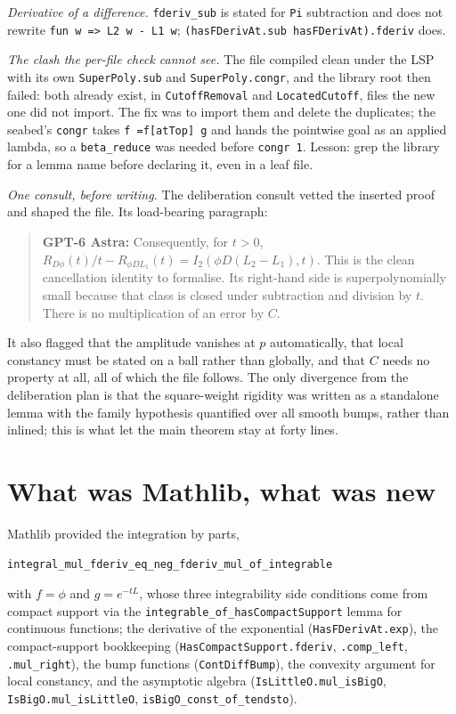 \documentclass[11pt]{article}
\newcommand{\code}[1]{\texttt{#1}}
\newcommand{\gptbox}[1]{\par\medskip\begin{quote}\small\textbf{\textcolor{green!50!black}{GPT-6 Astra:}} #1\end{quote}\medskip}
\begin{document}
\emph{Derivative of a difference.} \code{fderiv\_sub} is stated for
\code{Pi} subtraction and does not rewrite \code{fun w => L2 w - L1 w};
\code{(hasFDerivAt.sub hasFDerivAt).fderiv} does.

\emph{The clash the per-file check cannot see.} The file compiled clean
under the LSP with its own \code{SuperPoly.sub} and \code{SuperPoly.congr},
and the library root then failed: both already exist, in
\code{CutoffRemoval} and \code{LocatedCutoff}, files the new one did not
import. The fix was to import them and delete the duplicates; the
seabed's \code{congr} takes \code{f =f[atTop] g} and hands the pointwise
goal as an applied lambda, so a \code{beta\_reduce} was needed before
\code{congr 1}. Lesson: grep the library for a lemma name before
declaring it, even in a leaf file.

\emph{One consult, before writing.} The deliberation consult vetted the
inserted proof and shaped the file. Its load-bearing paragraph:
\gptbox{Consequently, for $t>0$, $R_{D\phi}(t)/t - R_{\phi DL_1}(t) =
I_2(\phi D(L_2-L_1),t)$. This is the clean cancellation identity to
formalise. Its right-hand side is superpolynomially small because that
class is closed under subtraction and division by $t$. There is no
multiplication of an error by $C$.}
It also flagged that the amplitude vanishes at $p$ automatically, that
local constancy must be stated on a ball rather than globally, and that
$C$ needs no property at all, all of which the file follows. The only
divergence from the deliberation plan is that the square-weight
rigidity was written as a standalone lemma with the family hypothesis
quantified over all smooth bumps, rather than inlined; this is what let
the main theorem stay at forty lines.

\section{What was Mathlib, what was new}

Mathlib provided the integration by parts,
\begin{center}\code{integral\_mul\_fderiv\_eq\_neg\_fderiv\_mul\_of\_integrable}\end{center}
with $f = \phi$ and $g = e^{-tL}$, whose three integrability side conditions
come from compact support via the
\code{integrable\_of\_hasCompactSupport} lemma for continuous functions; the derivative of the exponential (\code{HasFDerivAt.exp}), the
compact-support bookkeeping (\code{HasCompactSupport.fderiv},
\code{.comp\_left}, \code{.mul\_right}), the bump functions
(\code{ContDiffBump}), the convexity argument for local constancy, and
the asymptotic algebra (\code{IsLittleO.mul\_isBigO},
\code{IsBigO.mul\_isLittleO}, \code{isBigO\_const\_of\_tendsto}).
\end{document}

